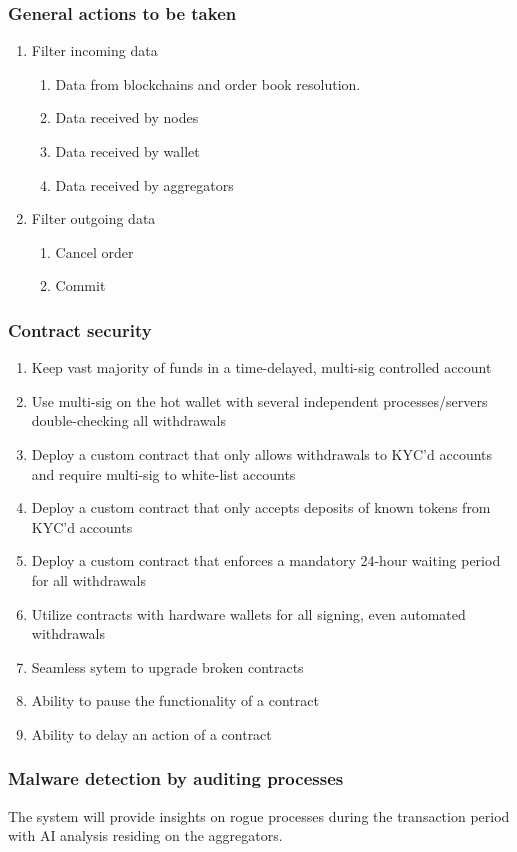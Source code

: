 \documentclass[]{article}
\begin{document}
	\subsubsection{General actions to be taken}
		\begin{enumerate}	
		\item{Filter incoming data} 
		\begin{enumerate}
			\item Data from blockchains and order book resolution.
			\item Data received by nodes
			\item Data received by wallet
			\item Data received by aggregators
		\end{enumerate}
		\item {Filter outgoing data}
		\begin{enumerate}
			\item Cancel order
			\item Commit
		\end{enumerate}
	\end{enumerate}
		\subsubsection{Contract security}
		\begin{enumerate}
		\item Keep vast majority of funds in a time-delayed, multi-sig controlled account
		\item Use multi-sig on the hot wallet with several independent processes/servers double-checking all withdrawals
		\item Deploy a custom contract that only allows withdrawals to KYC'd accounts and require multi-sig to white-list accounts
		\item Deploy a custom contract that only accepts deposits of known tokens from KYC'd accounts
		\item Deploy a custom contract that enforces a mandatory 24-hour waiting period for all withdrawals
		\item Utilize contracts with hardware wallets for all signing, even automated withdrawals
		\item Seamless sytem to upgrade broken contracts
		\item Ability to pause the functionality of a contract 
		\item Ability to delay an action of a contract	
		\end{enumerate}
		\subsubsection{Malware detection by auditing processes}
		The system will provide insights on rogue processes during the transaction period with AI analysis residing on the aggregators.
\end{document}
